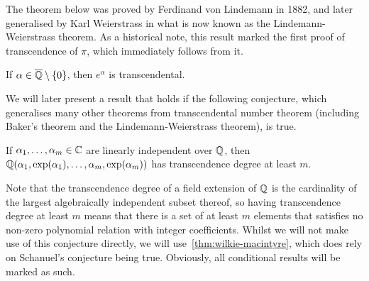 
The theorem below was proved by Ferdinand von Lindemann in 1882, and later generalised by Karl Weierstrass in what is now known as the Lindemann-Weierstrass theorem. As a historical note, this result marked the first proof of transcendence of $\pi$, which immediately follows from it.

\begin{theorem}[Lindemann]
If $\alpha \in \overline{\mathbb{Q}} \setminus \lbrace 0 \rbrace$, then $e^{\alpha}$ is transcendental.
\end{theorem}

We will later present a result that holds if the following conjecture, which generalises many other theorems from transcendental number theorem (including Baker's theorem and the Lindemann-Weierstrass theorem), is true.

\begin{conjecture}[Schanuel]
  If $\alpha_{1}, \ldots, \alpha_{m} \in \mathbb{C}$ are linearly independent over $\mathbb{Q}$, then $\mathbb{Q}(\alpha_{1}, \exp(\alpha_{1}), \ldots, \alpha_{m}, \exp(\alpha_{m}))$ has transcendence degree at least $m$.
\end{conjecture}
Note that the transcendence degree of a field extension of $\mathbb{Q}$ is the cardinality of the largest algebraically independent subset thereof, so having transcendence degree at least $m$ means that there is a set of at least $m$ elements that satisfies no non-zero polynomial relation with integer coefficients.
Whilst we will not make use of this conjecture directly, we will use~\cref{thm:wilkie-macintyre}, which does rely on Schanuel's conjecture being true. Obviously, all conditional results will be marked as such.
